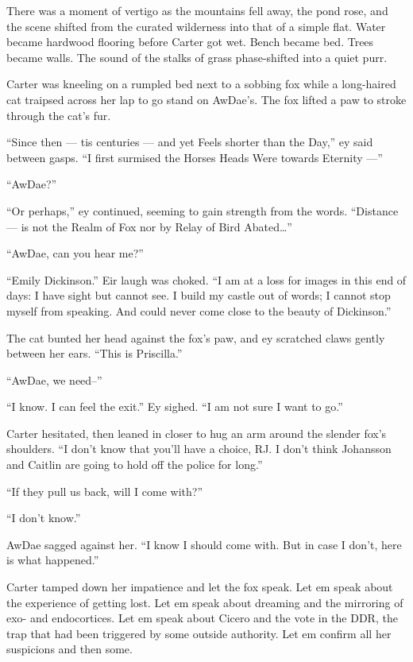 There was a moment of vertigo as the mountains fell away, the pond rose, and the scene shifted from the curated wilderness into that of a simple flat. Water became hardwood flooring before Carter got wet. Bench became bed. Trees became walls. The sound of the stalks of grass phase-shifted into a quiet purr.

Carter was kneeling on a rumpled bed next to a sobbing fox while a long-haired cat traipsed across her lap to go stand on AwDae's. The fox lifted a paw to stroke through the cat's fur.

``Since then — tis centuries — and yet Feels shorter than the Day,'' ey said between gasps. ``I first surmised the Horses Heads Were towards Eternity —''

``AwDae?''

``Or perhaps,'' ey continued, seeming to gain strength from the words. ``Distance — is not the Realm of Fox nor by Relay of Bird Abated\ldots{}''

``AwDae, can you hear me?''

``Emily Dickinson.'' Eir laugh was choked. ``I am at a loss for images in this end of days: I have sight but cannot see. I build my castle out of words; I cannot stop myself from speaking. And could never come close to the beauty of Dickinson.''

The cat bunted her head against the fox's paw, and ey scratched claws gently between her ears. ``This is Priscilla.''

``AwDae, we need--''

``I know. I can feel the exit.'' Ey sighed. ``I am not sure I want to go.''

Carter hesitated, then leaned in closer to hug an arm around the slender fox's shoulders. ``I don't know that you'll have a choice, RJ. I don't think Johansson and Caitlin are going to hold off the police for long.''

``If they pull us back, will I come with?''

``I don't know.''

AwDae sagged against her. ``I know I should come with. But in case I don't, here is what happened.''

Carter tamped down her impatience and let the fox speak. Let em speak about the experience of getting lost. Let em speak about dreaming and the mirroring of exo- and endocortices. Let em speak about Cicero and the vote in the DDR, the trap that had been triggered by some outside authority. Let em confirm all her suspicions and then some.

